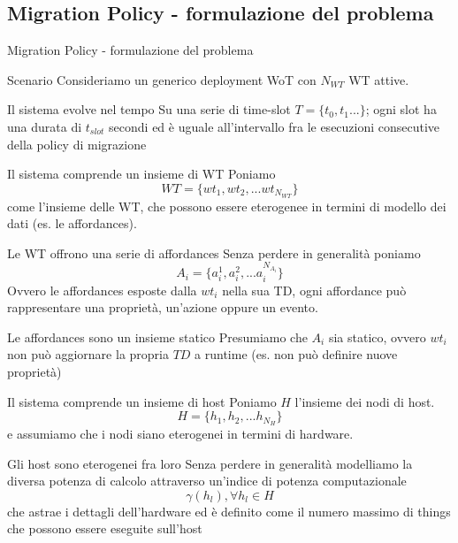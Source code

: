 \documentclass{beamer}
\begin{document}
\subsection{Migration Policy - formulazione del problema}
\begin{frame}[allowframebreaks]{Migration Policy - formulazione del problema}
	\begin{block}{Scenario}
		Consideriamo un generico deployment WoT con $N_{WT}$ WT attive.
	\end{block}
	\begin{block}{Il sistema evolve nel tempo}
		Su una serie di time-slot $T = \{t_0, t_1...\}$; ogni slot ha una durata di $t_{slot}$ secondi ed è uguale all'intervallo fra le esecuzioni consecutive della policy di migrazione
	\end{block}
	\begin{block}{Il sistema comprende un insieme di WT}
		Poniamo \[WT = \{ wt_1, wt_2, ... wt_{N_{WT}} \}\] come l'insieme delle WT, che possono essere eterogenee in termini di modello dei dati (es. le affordances).
	\end{block}
	\begin{block}{Le WT offrono una serie di affordances}
		Senza perdere in generalità poniamo \[A_i = \{a_i^1, a_i^2, ... a_i^{N_{A_i}}\}\] Ovvero le affordances esposte dalla $wt_i$ nella sua TD, ogni affordance può rappresentare una proprietà, un'azione oppure un evento.
	\end{block}
	\begin{alertblock}{Le affordances sono un insieme statico}
		Presumiamo che $A_i$ sia statico, ovvero $wt_i$ non può aggiornare la propria $TD$ a runtime (es. non può definire nuove proprietà)
	\end{alertblock}
	\pagebreak
	\begin{block}{Il sistema comprende un insieme di host}
		Poniamo $H$ l'insieme dei nodi di host. \[H = \{h_1, h_2, ... h_{N_H}\}\] e assumiamo che i nodi siano eterogenei in termini di hardware.
	\end{block}
	\begin{alertblock}{Gli host sono eterogenei fra loro}
		Senza perdere in generalità modelliamo la diversa potenza di calcolo attraverso un'indice di potenza computazionale \[\gamma(h_l), \forall h_l \in H\] che astrae i dettagli dell'hardware ed è definito come il numero massimo di things che possono essere eseguite sull'host
	\end{alertblock}
	\pagebreak
	

\end{frame}
\end{document}
